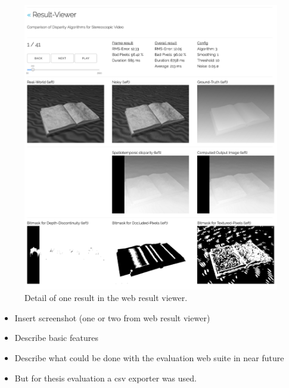 \begin{figure}[p!]
  \centering
  \includegraphics[angle=90,width=1.0\textwidth]{src/images/result-viewer-detail.png}
  \caption{Detail of one result in the web result viewer.}
  \label{fig:web-detail}
\end{figure}

\begin{itemize}
  \item Insert screenshot (one or two from web result viewer)
  \item Describe basic features
  \item Describe what could be done with the evaluation web suite in near future
  \item But for thesis evaluation a csv exporter was used.
\end{itemize}





